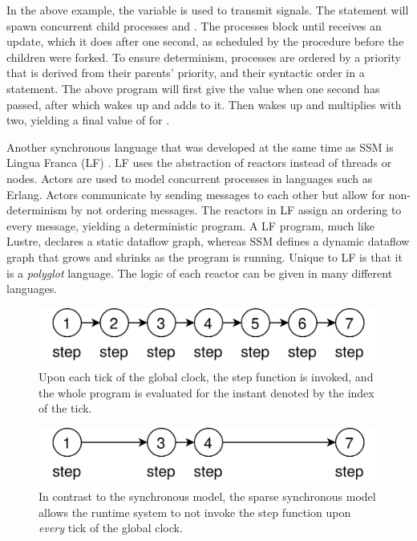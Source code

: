 In the above example, the variable  is used to transmit signals. The  statement will spawn concurrent
child processes  and . The processes block until  receives an update, which it does after one second,
as scheduled by the  procedure before the children were forked. To ensure determinism, processes are ordered
by a priority that is derived from their parents' priority, and their syntactic order in a  statement. The
above program will first give  the value  when one second has passed, after which  wakes up and
adds  to it. Then  wakes up and multiplies  with two, yielding a final value of  for .

Another synchronous language that was developed at the same time as SSM is Lingua Franca (LF)
\cite{DBLP:journals/tecs/LohstrohMBL21}. LF uses the abstraction
of reactors instead of threads or nodes. Actors are used to model concurrent processes in languages such as Erlang. Actors
communicate by sending messages to each other but allow for non-determinism by not ordering messages.
The reactors in LF assign an ordering to every message, yielding a deterministic program.
A LF program, much like Lustre, declares a static dataflow graph, whereas SSM defines a dynamic dataflow graph that grows and shrinks as the
program is running.
Unique to LF is that it is a \textit{polyglot} language. The logic of each reactor can be given in many different
languages.

\begin{figure}
    \centering
    \includegraphics[scale=0.2]{graphics/clock-governed.png}
    \caption{Upon each tick of the global clock, the step function is invoked, and the whole program
    is evaluated for the instant denoted by the index of the tick.}
    \label{graphics:global-clock}
\end{figure}

\begin{figure}
    \centering
    \includegraphics[scale=0.2]{graphics/sparse-clock.png}
    \caption{In contrast to the synchronous model, the sparse synchronous model allows the runtime system to
    not invoke the step function upon \textit{every} tick of the global clock.}
    \label{graphics:sparse-clock}
\end{figure}

